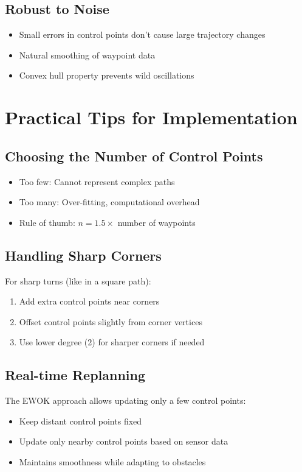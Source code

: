 \documentclass[12pt,a4paper]{article}
\begin{document}
\subsection{Robust to Noise}
\begin{itemize}
    \item Small errors in control points don't cause large trajectory changes
    \item Natural smoothing of waypoint data
    \item Convex hull property prevents wild oscillations
\end{itemize}

\section{Practical Tips for Implementation}

\subsection{Choosing the Number of Control Points}

\begin{itemize}
    \item Too few: Cannot represent complex paths
    \item Too many: Over-fitting, computational overhead
    \item Rule of thumb: $n = 1.5 \times$ number of waypoints
\end{itemize}

\subsection{Handling Sharp Corners}

For sharp turns (like in a square path):
\begin{enumerate}
    \item Add extra control points near corners
    \item Offset control points slightly from corner vertices
    \item Use lower degree (2) for sharper corners if needed
\end{enumerate}

\subsection{Real-time Replanning}

The EWOK approach allows updating only a few control points:
\begin{itemize}
    \item Keep distant control points fixed
    \item Update only nearby control points based on sensor data
    \item Maintains smoothness while adapting to obstacles
\end{itemize}
\end{document}
